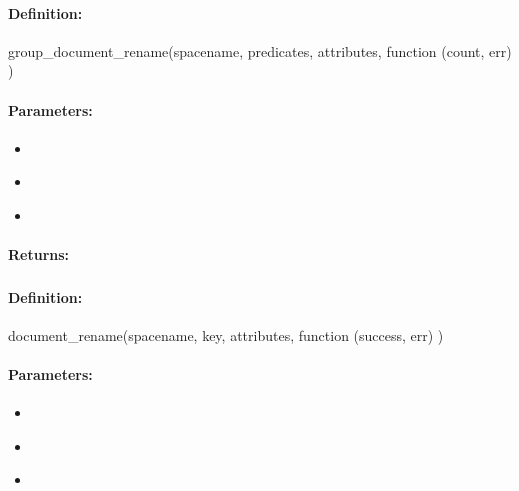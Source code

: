 \paragraph{Definition:}
\begin{javascriptcode}
group_document_rename(spacename, predicates, attributes, function (count, err) {})
\end{javascriptcode}
\paragraph{Parameters:}
\begin{itemize}[noitemsep]
\item {}\\

\item {}\\

\item {}\\

\end{itemize}

\paragraph{Returns:}


\pagebreak
\subsubsection{}
\label{api:nodejs:document_rename}


\paragraph{Definition:}
\begin{javascriptcode}
document_rename(spacename, key, attributes, function (success, err) {})
\end{javascriptcode}
\paragraph{Parameters:}
\begin{itemize}[noitemsep]
\item {}\\

\item {}\\

\item {}\\

\end{itemize}

